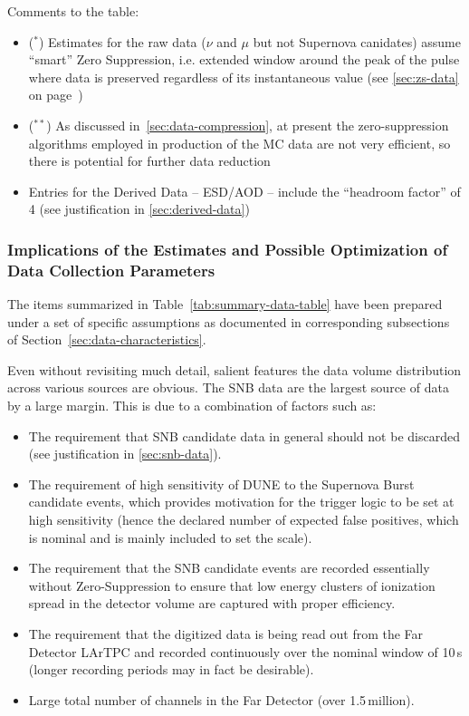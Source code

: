 Comments to the table:
\begin{itemize}
\item ($^*$) Estimates for the raw data ($\nu$ and $\mu$ but not Supernova canidates) assume ``smart'' Zero Suppression, i.e. extended
window around the peak of the pulse where data is preserved regardless of its instantaneous value (see \ref{sec:zs-data} on page~\pageref{sec:zs-data})

\item ($^{**}$) As discussed in~\ref{sec:data-compression}, at present the zero-suppression algorithms employed in production of the
MC data are not very efficient, so there is potential for further data reduction

\item Entries for the Derived Data -- ESD/AOD --  include the ``headroom factor'' of 4 (see justification in \ref{sec:derived-data})
\end{itemize}

\subsubsection{Implications of the Estimates and Possible Optimization of Data Collection Parameters}
The items summarized in Table~\ref{tab:summary-data-table} have been prepared under a set of specific
assumptions as documented in corresponding subsections of Section~\ref{sec:data-characteristics}.

Even without revisiting much detail, salient features the data volume distribution across various sources are
obvious. The SNB data are the largest source of data by a large margin. This is due to a combination of factors such as:
\begin{itemize}

\item The requirement that SNB candidate data in general should not be discarded (see justification in \ref{sec:snb-data}).

\item The requirement of high sensitivity of DUNE to the Supernova Burst candidate events, which provides motivation
for the trigger logic to be set at high sensitivity (hence the declared number of expected false positives, which is nominal
and is mainly included to set the scale).

\item The requirement that the SNB candidate events are recorded essentially without Zero-Suppression to ensure that low energy
clusters of ionization spread in the detector volume are captured with proper efficiency.

\item The requirement that the digitized data is being read out from the Far Detector LArTPC and recorded continuously over
the nominal window of 10\,s (longer recording periods may in fact be desirable).

\item Large total number of channels in the Far Detector (over 1.5\,million).

\end{itemize}

